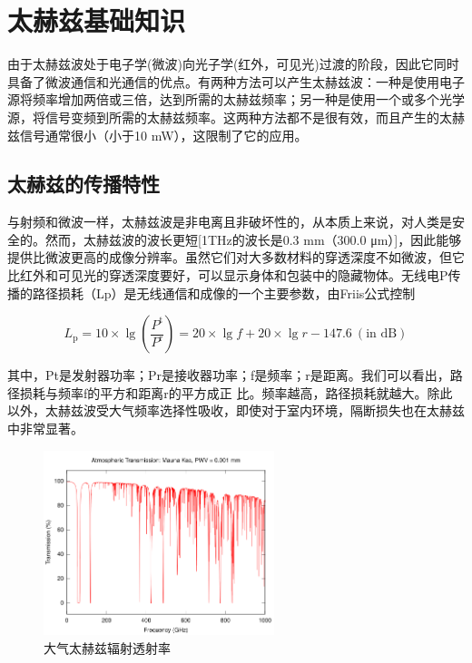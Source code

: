 \section{太赫兹基础知识}

由于太赫兹波处于电子学(微波)向光子学(红外，可见光)过渡的阶段，因此它同时具备了微波通信和光通信的优点。有两种方法可以产生太赫兹波：一种是使用电子源将频率增加两倍或三倍，达到所需的太赫兹频率；另一种是使用一个或多个光学源，将信号变频到所需的太赫兹频率。这两种方法都不是很有效，而且产生的太赫兹信号通常很小（小于10 mW），这限制了它的应用。


\subsection{太赫兹的传播特性}

与射频和微波一样，太赫兹波是非电离且非破坏性的，从本质上来说，对人类是安全的。然而，太赫兹波的波长更短[1THz的波长是0.3 mm（300.0 μm）]，因此能够提供比微波更高的成像分辨率。虽然它们对大多数材料的穿透深度不如微波，但它比红外和可见光的穿透深度要好，可以显示身体和包装中的隐藏物体。无线电P传播的路径损耗（Lp）是无线通信和成像的一个主要参数，由Friis公式\cite{huang2021antennas}控制

\begin{equation}
	L_{\mathrm{p}} = 10 \times \lg \left( \frac{P^{\mathrm{t}}}{P^{\mathrm{r}}} \right) = 20 \times \lg f + 20 \times \lg r - 147.6 \ (\text{in dB})
	\tag{1}
\end{equation}

其中，Pt是发射器功率；Pr是接收器功率；f是频率；r是距离。我们可以看出，路径损耗与频率f的平方和距离r的平方成正
比。频率越高，路径损耗就越大。除此以外，太赫兹波受大气频率选择性吸收，即使对于室内环境，隔断损失也在太赫兹中非常显著。

\begin{figure}[htbp]
	\centering
	\includegraphics[width=0.6\textwidth]{img/img2.png} %
	\caption{大气太赫兹辐射透射率\cite{982447}}
	\label{fig:example}
\end{figure}



